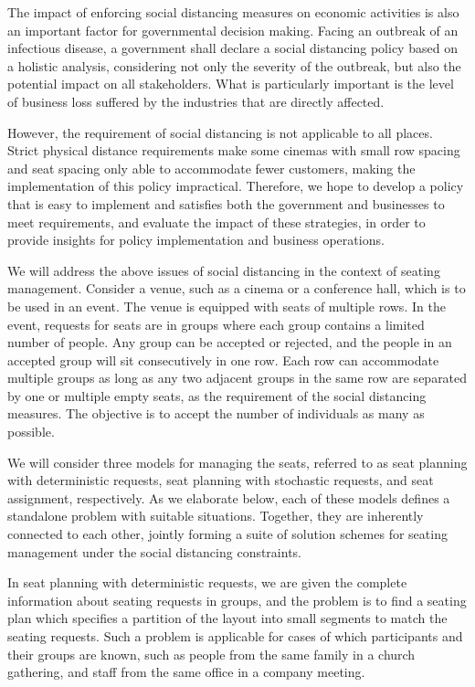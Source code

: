 The impact of enforcing social distancing measures on economic activities is also an important factor for governmental decision making. Facing an outbreak of an infectious disease, a government shall declare a social distancing policy based on a holistic analysis, considering not only the severity of the outbreak, but also the potential impact on all stakeholders. What is particularly important is the level of business loss suffered by the industries that are directly affected.  

However, the requirement of social distancing is not applicable to all places. Strict physical distance requirements make some cinemas with small row spacing and seat spacing only able to accommodate fewer customers, making the implementation of this policy impractical. Therefore, we hope to develop a policy that is easy to implement and satisfies both the government and businesses to meet requirements, and evaluate the impact of these strategies, in order to provide insights for policy implementation and business operations.


We will address the above issues of social distancing in the context of seating management. Consider a venue, such as a cinema or a conference hall, which is to be used in an event. The venue is equipped with seats of multiple rows. In the event, requests for seats are in groups where each group contains a limited number of people. Any group can be accepted or rejected, and the people in an accepted group  will sit consecutively in one row. Each row can accommodate multiple groups as long as any two adjacent groups in the same row are separated by one or multiple empty seats, as the requirement of the social distancing measures. The objective is to accept the number of individuals as many as possible.

We will consider three models for managing the seats, referred to as seat planning with deterministic requests, seat planning with stochastic requests, and seat assignment, respectively. As we elaborate below, each of these models defines a standalone problem with suitable situations. Together, they are inherently connected to each other, jointly forming a suite of solution schemes for seating management under the social distancing constraints.

In seat planning with deterministic requests, we are given the complete information about seating requests in groups, and the problem is to find a seating plan which specifies a partition of the layout into small segments to match the seating requests. Such a problem is applicable for cases of which participants and their groups are known, such as people from the same family in a church gathering, and staff from the same office in a company meeting.
 
